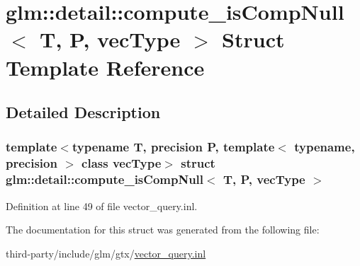 \hypertarget{structglm_1_1detail_1_1compute__is_comp_null}{}\section{glm\+:\+:detail\+:\+:compute\+\_\+is\+Comp\+Null$<$ T, P, vec\+Type $>$ Struct Template Reference}
\label{structglm_1_1detail_1_1compute__is_comp_null}


\subsection{Detailed Description}
\subsubsection*{template$<$typename T, precision P, template$<$ typename, precision $>$ class vec\+Type$>$\newline
struct glm\+::detail\+::compute\+\_\+is\+Comp\+Null$<$ T, P, vec\+Type $>$}



Definition at line 49 of file vector\+\_\+query.\+inl.



The documentation for this struct was generated from the following file\+:\begin{DoxyCompactItemize}
\item 
third-\/party/include/glm/gtx/\hyperlink{vector__query_8inl}{vector\+\_\+query.\+inl}\end{DoxyCompactItemize}
